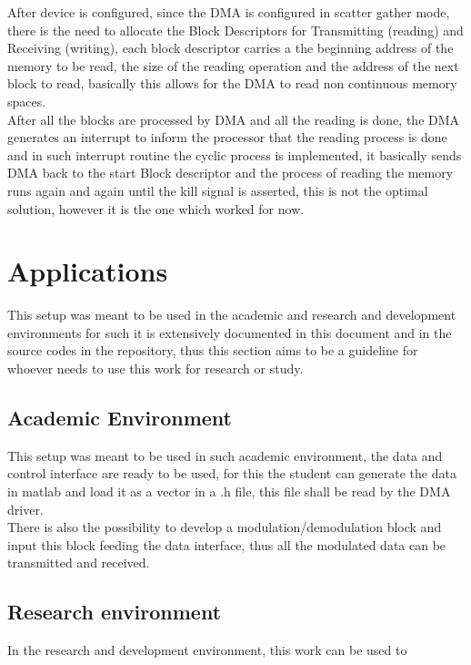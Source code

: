 After device is configured, since the DMA is configured in scatter gather mode,
there is the need to allocate the Block Descriptors for Transmitting (reading)
and Receiving (writing), each block descriptor carries a the beginning address
of the memory to be read, the size of the reading operation and the address of
the next block to read, basically this allows for the DMA to read non continuous
memory spaces.\\

After all the blocks are processed by DMA and all the reading is done, the DMA
generates an interrupt to inform the processor that the reading process is done
and in such interrupt routine the cyclic process is implemented, it basically
sends DMA back to the start Block descriptor and the process of reading the
memory runs again and again until the kill signal is asserted, this is not the
optimal solution, however it is the one which worked for now.\\

\section{Applications}

This setup was meant to be used in the academic and research and development
environments for such it is extensively documented in this document and in the
source codes in the repository, thus this section aims to be a guideline for
whoever needs to use this work for research or study.

\subsection{Academic Environment}

This setup was meant to be used in such academic environment, the data and control
interface are ready to be used, for this the student can generate the data in
matlab and load it as a vector in a .h file, this file shall be read by the DMA
driver.\\
There is also the possibility to develop a modulation/demodulation block
and input this block feeding the data interface, thus all the modulated data can
be transmitted and received.

\subsection{Research environment}

In the research and development environment, this work can be used to
